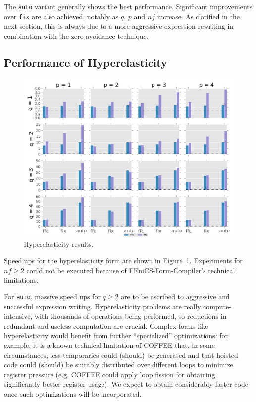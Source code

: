 The \texttt{auto} variant generally shows the best performance. Significant improvements over \texttt{fix} are also achieved, notably as $q$, $p$ and $nf$ increase. As clarified in the next section, this is always due to a more aggressive expression rewriting in combination with the zero-avoidance technique.


\subsection{Performance of Hyperelasticity}
\begin{figure}[t]
\centerline{\includegraphics[scale=0.7]{coffee/perf-results/allforms/hyperelasticity}}
\caption{Hyperelasticity results.}\label{fig:coffee-allforms-hyperelasticity}
\end{figure}

Speed ups for the hyperelasticity form are shown in Figure~\ref{fig:coffee-allforms-hyperelasticity}. Experiments for $nf \geq 2$ could not be executed because of FEniCS-Form-Compiler's technical limitations. 

For \texttt{auto}, massive speed ups for $q \geq 2$ are to be ascribed to aggressive and successful expression writing. Hyperelasticity problems are really compute-intensive, with thousands of operations being performed, so reductions in redundant and useless computation are crucial. Complex forms like hyperelasticity would benefit from further ``specialized'' optimizations: for example, it is a known technical limitation of COFFEE that, in some circumstances, less temporaries could (should) be generated and that hoisted code could (should) be suitably distributed over different loops to minimize register pressure (e.g. COFFEE could apply loop fission for obtaining significantly better register usage). We expect to obtain considerably faster code once such optimizations will be incorporated. 

